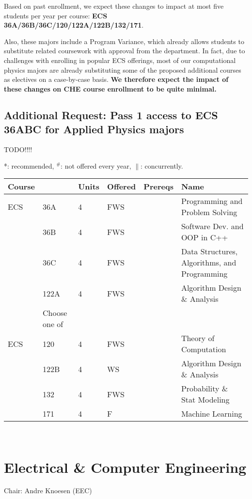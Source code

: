 \documentclass[12pt]{article}
\begin{document}
Based on past enrollment, we expect these changes to impact at most
five students per year per course: {\bf ECS 36A/36B/36C/120/122A/122B/132/171}.

Also, these majors include a Program Variance, which already allows
students to substitute related coursework with approval from the
department.  In fact, due to challenges with enrolling in popular ECS
offerings, most of our computational physics majors are already
substituting some of the proposed additional courses as electives on a
case-by-case basis.  {\bf We therefore expect the impact of these
  changes on CHE course enrollment to be quite minimal.}

\subsection{Additional Request: Pass 1 access to ECS 36ABC for Applied Physics majors}

TODO!!!!

\newpage
{}
\vskip 0.25cm
\noindent
*: recommended, $^\#$: not offered every year, $\parallel$: concurrently.\\
\begin{tabular}{|llllll|}
\hline
Course & & Units & Offered & Prereqs & Name \\
\hline
ECS & 36A  & 4 & FWS & & Programming and Problem Solving\\
    & 36B  & 4 & FWS & & Software Dev. and OOP in C++\\
    & 36C  & 4 & FWS & & Data Structures, Algorithms, and Programming\\
    & 122A & 4 & FWS & & Algorithm Design \& Analysis\\
\hline
\hline
    & Choose one of & & & & \\
\hline
ECS & 120  & 4 & FWS & & Theory of Computation \\
    & 122B & 4 & WS  & & Algorithm Design \& Analysis \\
    & 132  & 4 & FWS & & Probability \& Stat Modeling \\
    & 171  & 4 & F   & & Machine Learning \\
\hline
\end{tabular}\\

\newpage
\section{Electrical \& Computer Engineering}
Chair: Andre Knoesen (EEC)
\end{document}
